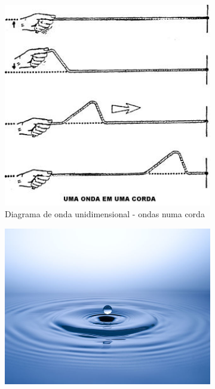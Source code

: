 \documentclass[12pt]{extarticle}
\newcommand{\<}{\langle}
\renewcommand{\>}{\rangle}
\theoremstyle{definition}
\begin{document}
\begin{figure}[H]
     \centering
     \begin{subfigure}[b]{0.3\textwidth}
         \centering
         \includegraphics[width=\textwidth]{unidimensionais.jpg}
         \caption{Diagrama de onda unidimensional - ondas numa corda}
         \label{fig:unidimensional}
     \end{subfigure}
     \hfill
     \begin{subfigure}[b]{0.3\textwidth}
         \centering
         \includegraphics[width=\textwidth]{bidimensionais.jpg}

\end{subfigure}
\end{figure}
\end{document}

